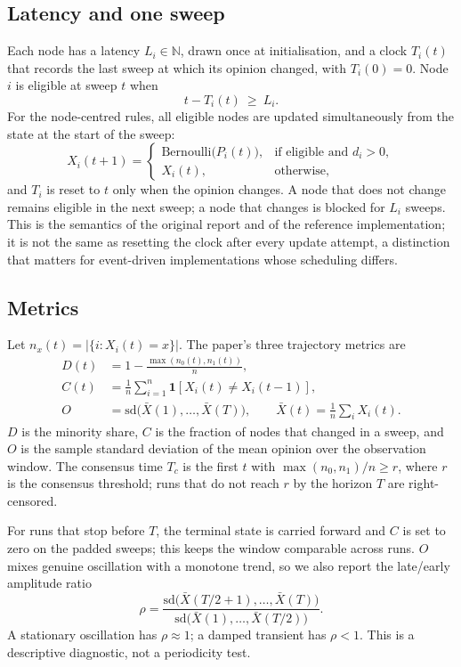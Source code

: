 \documentclass[conference]{IEEEtran}
\newcommand{\ind}{\mathbf{1}}
\begin{document}
\subsection{Latency and one sweep}
Each node has a latency $L_i\in\mathbb{N}$, drawn once at initialisation, and a clock $T_i(t)$ that records the last sweep at which its opinion changed, with $T_i(0)=0$. Node $i$ is eligible at sweep $t$ when
\begin{equation}
t-T_i(t)\ \ge\ L_i .
\label{eq:eligible}
\end{equation}
For the node-centred rules, all eligible nodes are updated simultaneously from the state at the start of the sweep:
\begin{equation}
X_i(t+1)=
\begin{cases}
\mathrm{Bernoulli}\big(P_i(t)\big), & \text{if eligible and } d_i>0,\\
X_i(t), & \text{otherwise},
\end{cases}
\label{eq:update}
\end{equation}
and $T_i$ is reset to $t$ only when the opinion changes. A node that does not change remains eligible in the next sweep; a node that changes is blocked for $L_i$ sweeps. This is the semantics of the original report and of the reference implementation; it is not the same as resetting the clock after every update attempt, a distinction that matters for event-driven implementations whose scheduling differs.

\subsection{Metrics}
Let $n_x(t)=|\{i:X_i(t)=x\}|$. The paper's three trajectory metrics are
\begin{align}
D(t)&=1-\frac{\max(n_0(t),n_1(t))}{n}, \label{eq:diversity}\\
C(t)&=\frac{1}{n}\sum_{i=1}^{n}\ind[X_i(t)\ne X_i(t-1)], \label{eq:cascade}\\
O&=\mathrm{sd}\big(\bar X(1),\dots,\bar X(T)\big),\qquad
\bar X(t)=\frac1n\sum_i X_i(t). \label{eq:osc}
\end{align}
$D$ is the minority share, $C$ is the fraction of nodes that changed in a sweep, and $O$ is the sample standard deviation of the mean opinion over the observation window. The consensus time $T_c$ is the first $t$ with $\max(n_0,n_1)/n\ge r$, where $r$ is the consensus threshold; runs that do not reach $r$ by the horizon $T$ are right-censored.

For runs that stop before $T$, the terminal state is carried forward and $C$ is set to zero on the padded sweeps; this keeps the window comparable across runs. $O$ mixes genuine oscillation with a monotone trend, so we also report the late/early amplitude ratio
\begin{equation}
\rho=\frac{\mathrm{sd}\big(\bar X(T/2+1),\dots,\bar X(T)\big)}
{\mathrm{sd}\big(\bar X(1),\dots,\bar X(T/2)\big)} .
\label{eq:ratio}
\end{equation}
A stationary oscillation has $\rho\approx1$; a damped transient has $\rho<1$. This is a descriptive diagnostic, not a periodicity test.
\end{document}
